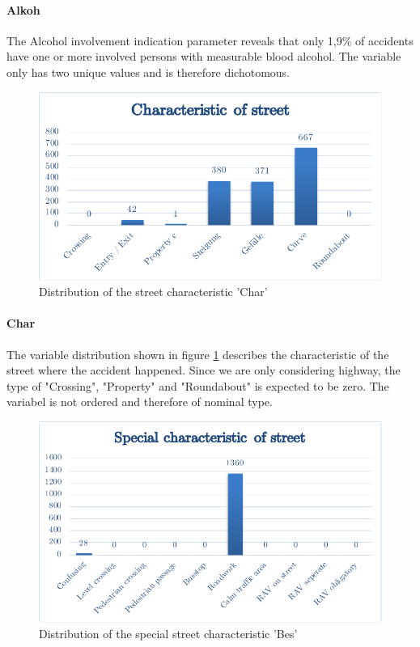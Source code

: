 \documentclass[a4paper,12pt]{report}
\begin{document}
\paragraph{Alkoh}
The Alcohol involvement indication parameter reveals that only 1,9\% of accidents have one or more involved persons with measurable blood alcohol. The variable only has two unique values and is therefore dichotomous.

\begin{figure}[h]
	\centering
	\includegraphics[scale=0.6]{./assets/baysis_dataset_Char.pdf}
	\caption{Distribution of the street characteristic 'Char'}
	\label{img:baysis_dataset_Char}
\end{figure}

\paragraph{Char}
The variable distribution shown in figure \ref{img:baysis_dataset_Char} describes the characteristic of the street where the accident happened. Since we are only considering highway, the type of "Crossing", "Property" and "Roundabout" is expected to be zero. The variabel is not ordered and therefore of nominal type.

\begin{figure}[h]
	\centering
	\includegraphics[scale=0.6]{./assets/baysis_dataset_Bes.pdf}
	\caption{Distribution of the special street characteristic 'Bes'}
	\label{img:baysis_dataset_Bes}
\end{figure}
\end{document}

